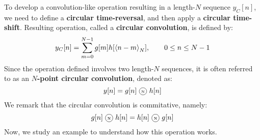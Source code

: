 \documentclass[../../main/main.tex]{subfiles}
\begin{document}
To develop a convolution-like operation resulting in a length-\( N \) sequence \( y_{C}[n] \), we need to define a \textbf{circular time-reversal}, and then apply a \textbf{circular time-shift}.
Resulting operation, called a \textbf{circular convolution}, is defined by:
\begin{equation}
    y_{C}[n]
    =
    \sum_{m=0}^{N-1} g[m]h[\expval{n-m}_{N}],
    \qquad
    0 \le n \le N-1
    \label{eq:L12_S42_1}
\end{equation}
Since the operation defined involves two length-\( N \) sequences, it is often referred to as an \textbf{\( N \)-point circular convolution}, denoted as:
\begin{equation}
    y[n]
    =
    g[n] \circled{N} h[n]
    \label{eq:L12_S43_1}
\end{equation}
We remark that the circular convolution is commitative, namely:
\begin{equation}
    g[n] \circled{N} h[n]
    =
    h[n] \circled{N} g[n]
    \label{eq:L12_S43_2}
\end{equation}
Now, we study an example to understand how this operation works.
\end{document}
